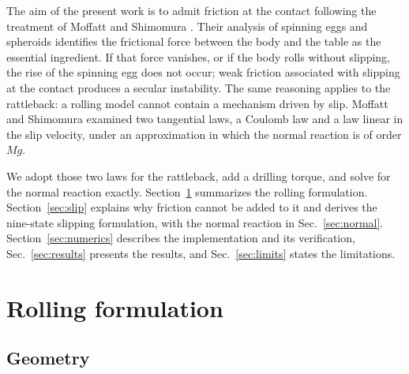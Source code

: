 \documentclass[aps,pre,twocolumn,superscriptaddress,amsmath,amssymb,floatfix,nofootinbib]{revtex4-2}
\begin{document}
The aim of the present work is to admit friction at the contact following the treatment
of Moffatt and Shimomura \cite{Moffatt2002}. Their analysis of spinning eggs and spheroids
identifies the frictional force between the body and the table as the essential
ingredient. If that force vanishes, or if the body rolls without slipping, the rise of
the spinning egg does not occur; weak friction associated with slipping at the contact
produces a secular instability. The same reasoning applies to the rattleback: a rolling
model cannot contain a mechanism driven by slip. Moffatt and Shimomura examined two
tangential laws, a Coulomb law and a law linear in the slip velocity, under an
approximation in which the normal reaction is of order $Mg$.

We adopt those two laws for the rattleback, add a drilling torque, and solve for the
normal reaction exactly. Section~\ref{sec:rolling} summarizes the rolling formulation.
Section~\ref{sec:slip} explains why friction cannot be added to it and derives the
nine-state slipping formulation, with the normal reaction in
Sec.~\ref{sec:normal}. Section~\ref{sec:numerics} describes the implementation and its
verification, Sec.~\ref{sec:results} presents the results, and Sec.~\ref{sec:limits}
states the limitations.

\section{Rolling formulation}\label{sec:rolling}

\subsection{Geometry}
\end{document}
